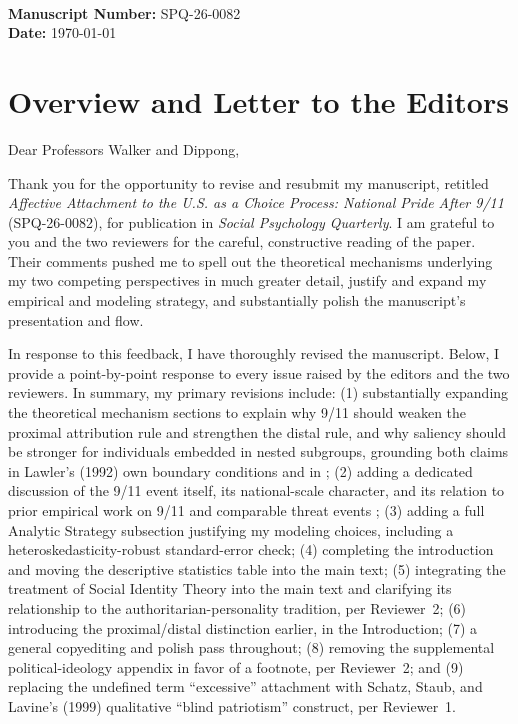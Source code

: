 \documentclass[11pt]{article}
\begin{document}
\\[6pt]
\textbf{Manuscript Number:} SPQ-26-0082\\
\textbf{Date:} \today\\[12pt]

\section*{Overview and Letter to the Editors}

Dear Professors Walker and Dippong,

Thank you for the opportunity to revise and resubmit my manuscript, retitled \textit{Affective Attachment to the U.S. as a Choice Process: National Pride After 9/11} (SPQ-26-0082), for publication in \textit{Social Psychology Quarterly}. I am grateful to you and the two reviewers for the careful, constructive reading of the paper. Their comments pushed me to spell out the theoretical mechanisms underlying my two competing perspectives in much greater detail, justify and expand my empirical and modeling strategy, and substantially polish the manuscript's presentation and flow.

In response to this feedback, I have thoroughly revised the manuscript. Below, I provide a point-by-point response to every issue raised by the editors and the two reviewers. In summary, my primary revisions include: (1) substantially expanding the theoretical mechanism sections to explain why 9/11 should weaken the proximal attribution rule and strengthen the distal rule, and why saliency should be stronger for individuals embedded in nested subgroups, grounding both claims in Lawler's (1992) own boundary conditions and in \citet{lawler2006commitment-b3a}; (2) adding a dedicated discussion of the 9/11 event itself, its national-scale character, and its relation to prior empirical work on 9/11 and comparable threat events \citep{perrin2005national, schatz2007waving, sullivan1992patriotism}; (3) adding a full Analytic Strategy subsection justifying my modeling choices, including a heteroskedasticity-robust standard-error check; (4) completing the introduction and moving the descriptive statistics table into the main text; (5) integrating the treatment of Social Identity Theory into the main text and clarifying its relationship to the authoritarian-personality tradition, per Reviewer~2; (6) introducing the proximal/distal distinction earlier, in the Introduction; (7) a general copyediting and polish pass throughout; (8) removing the supplemental political-ideology appendix in favor of a footnote, per Reviewer~2; and (9) replacing the undefined term ``excessive'' attachment with Schatz, Staub, and Lavine's (1999) qualitative ``blind patriotism'' construct, per Reviewer~1.
\end{document}
